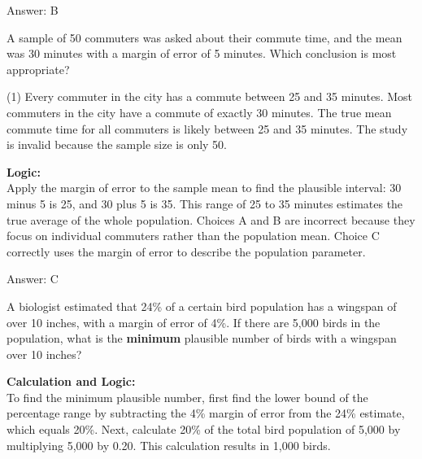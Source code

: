 \documentclass[11pt,paper=a4,answers]{exam}
\begin{document}
\begin{questions}
\begin{solution}
\vspace{30pt}

Answer: \colorbox{yellow!100}{B}
\end{solution}

\vspace{60pt}

\question
A sample of 50 commuters was asked about their commute time, and the mean was 30 minutes with a margin of error of 5 minutes. Which conclusion is most appropriate?
\begin{tasks}(1)
    \task Every commuter in the city has a commute between 25 and 35 minutes.
    \task Most commuters in the city have a commute of exactly 30 minutes.
    \task The true mean commute time for all commuters is likely between 25 and 35 minutes.
    \task The study is invalid because the sample size is only 50.
\end{tasks}

\begin{solution}
\textbf{Logic:} \\
Apply the margin of error to the sample mean to find the plausible interval: 30 minus 5 is 25, and 30 plus 5 is 35. This range of 25 to 35 minutes estimates the true average of the whole population. Choices A and B are incorrect because they focus on individual commuters rather than the population mean. Choice C correctly uses the margin of error to describe the population parameter.

\vspace{30pt}

Answer: \colorbox{yellow!100}{C}
\end{solution}

\vspace{60pt}

\question
A biologist estimated that 24\% of a certain bird population has a wingspan of over 10 inches, with a margin of error of 4\%. If there are 5,000 birds in the population, what is the \textbf{minimum} plausible number of birds with a wingspan over 10 inches?

\begin{solution}
\textbf{Calculation and Logic:} \\
To find the minimum plausible number, first find the lower bound of the percentage range by subtracting the 4\% margin of error from the 24\% estimate, which equals 20\%. Next, calculate 20\% of the total bird population of 5,000 by multiplying 5,000 by 0.20. This calculation results in 1,000 birds.


\end{solution}
\end{questions}
\end{document}
